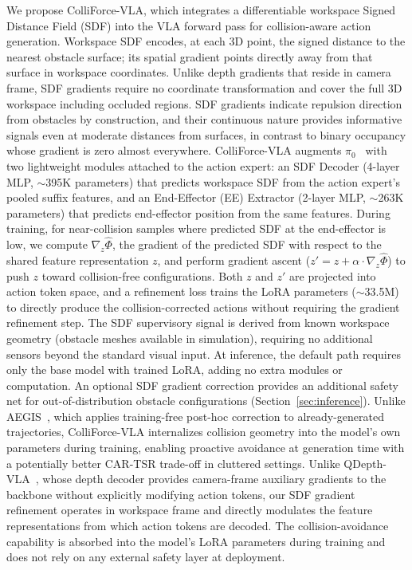We propose ColliForce-VLA, which integrates a differentiable workspace Signed Distance Field (SDF) into the VLA forward pass for collision-aware action generation. Workspace SDF encodes, at each 3D point, the signed distance to the nearest obstacle surface; its spatial gradient points directly away from that surface in workspace coordinates. Unlike depth gradients that reside in camera frame, SDF gradients require no coordinate transformation and cover the full 3D workspace including occluded regions. SDF gradients indicate repulsion direction from obstacles by construction, and their continuous nature provides informative signals even at moderate distances from surfaces, in contrast to binary occupancy whose gradient is zero almost everywhere. ColliForce-VLA augments $\pi_0$~\cite{black2024pi0} with two lightweight modules attached to the action expert: an SDF Decoder (4-layer MLP, ${\sim}$395K parameters) that predicts workspace SDF from the action expert's pooled suffix features, and an End-Effector (EE) Extractor (2-layer MLP, ${\sim}$263K parameters) that predicts end-effector position from the same features. During training, for near-collision samples where predicted SDF at the end-effector is low, we compute $\nabla_z \hat{\Phi}$, the gradient of the predicted SDF with respect to the shared feature representation $z$, and perform gradient ascent ($z' = z + \alpha \cdot \nabla_z \hat{\Phi}$) to push $z$ toward collision-free configurations. Both $z$ and $z'$ are projected into action token space, and a refinement loss trains the LoRA parameters (${\sim}$33.5M) to directly produce the collision-corrected actions without requiring the gradient refinement step. The SDF supervisory signal is derived from known workspace geometry (obstacle meshes available in simulation), requiring no additional sensors beyond the standard visual input. At inference, the default path requires only the base model with trained LoRA, adding no extra modules or computation. An optional SDF gradient correction provides an additional safety net for out-of-distribution obstacle configurations (Section~\ref{sec:inference}). Unlike AEGIS~\cite{hu2025vlsa}, which applies training-free post-hoc correction to already-generated trajectories, ColliForce-VLA internalizes collision geometry into the model's own parameters during training, enabling proactive avoidance at generation time with a potentially better CAR-TSR trade-off in cluttered settings. Unlike QDepth-VLA~\cite{li2025qdepth}, whose depth decoder provides camera-frame auxiliary gradients to the backbone without explicitly modifying action tokens, our SDF gradient refinement operates in workspace frame and directly modulates the feature representations from which action tokens are decoded. The collision-avoidance capability is absorbed into the model's LoRA parameters during training and does not rely on any external safety layer at deployment.

